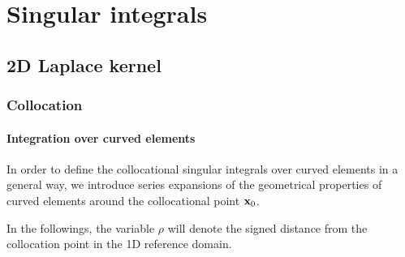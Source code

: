 \chapter{Singular integrals}

\section{2D Laplace kernel}

\subsection{Collocation}

\subsubsection{Integration over curved elements}

In order to define the collocational singular integrals over curved elements in a general way, we introduce series expansions of the geometrical properties of curved elements around the collocational point ${\bf x}_0$.

In the followings, the variable $\rho$ will denote the signed distance from the collocation point in the 1D reference domain.

